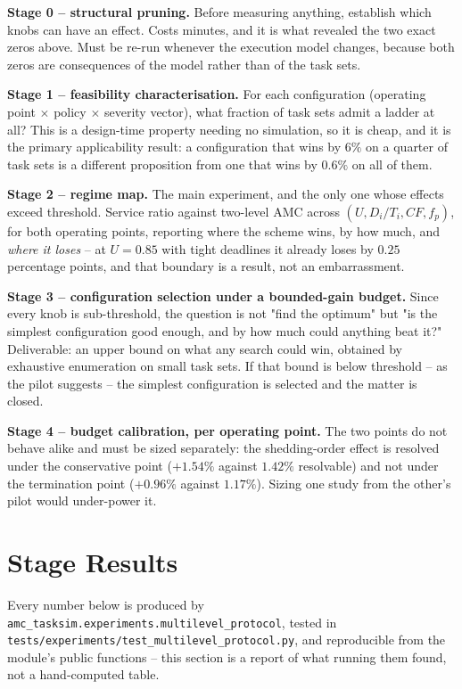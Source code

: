 \textbf{Stage 0 -- structural pruning.} Before measuring anything, establish
which knobs can have an effect. Costs minutes, and it is what revealed the two
exact zeros above. Must be re-run whenever the execution model changes, because
both zeros are consequences of the model rather than of the task sets.

\textbf{Stage 1 -- feasibility characterisation.} For each configuration
(operating point $\times$ policy $\times$ severity vector), what fraction of
task sets admit a ladder at all? This is a design-time property needing no
simulation, so it is cheap, and it is the primary applicability result: a
configuration that wins by $6\%$ on a quarter of task sets is a different
proposition from one that wins by $0.6\%$ on all of them.

\textbf{Stage 2 -- regime map.} The main experiment, and the only one whose
effects exceed threshold. Service ratio against two-level AMC across
$(U, D_i/T_i, CF, f_p)$, for both operating points, reporting where the scheme
wins, by how much, and \emph{where it loses} -- at $U = 0.85$ with tight
deadlines it already loses by $0.25$ percentage points, and that boundary is a
result, not an embarrassment.

\textbf{Stage 3 -- configuration selection under a bounded-gain budget.} Since
every knob is sub-threshold, the question is not "find the optimum" but "is the
simplest configuration good enough, and by how much could anything beat it?"
Deliverable: an upper bound on what any search could win, obtained by exhaustive
enumeration on small task sets. If that bound is below threshold -- as the pilot
suggests -- the simplest configuration is selected and the matter is closed.

\textbf{Stage 4 -- budget calibration, per operating point.} The two points do
not behave alike and must be sized separately: the shedding-order effect is
resolved under the conservative point ($+1.54\%$ against $1.42\%$ resolvable)
and not under the termination point ($+0.96\%$ against $1.17\%$). Sizing one
study from the other's pilot would under-power it.

\section{Stage Results}
\label{sec:stage-results}

Every number below is produced by
\texttt{amc\_tasksim.experiments.multilevel\_protocol}, tested in
\texttt{tests/experiments/test\_multilevel\_protocol.py}, and reproducible from
the module's public functions -- this section is a report of what running them
found, not a hand-computed table.

